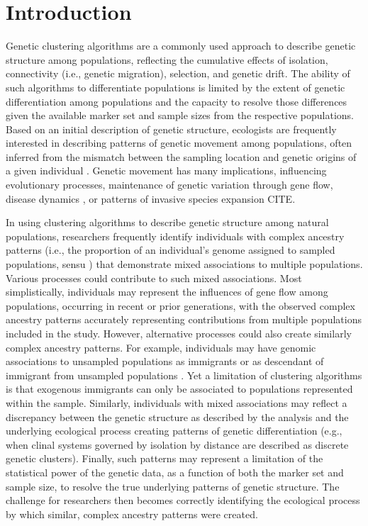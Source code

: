 
\section*{Introduction}

Genetic clustering algorithms are a commonly used approach to describe genetic structure among populations, reflecting the cumulative effects of isolation, connectivity (i.e., genetic migration), selection, and genetic drift.  The ability of such algorithms to differentiate populations is limited by the extent of genetic differentiation among populations and the capacity to resolve those differences given the available marker set and sample sizes from the respective populations.  Based on an initial description of genetic structure, ecologists are frequently interested in describing patterns of genetic movement among populations, often inferred from the mismatch between the sampling location and genetic origins of a given individual \citep{paetkau1995microsatellite,wilson2003bayesian}.  Genetic movement has many implications, influencing evolutionary processes, maintenance of genetic variation through gene flow, disease dynamics \citep{huestis2019windborne}, or patterns of invasive species expansion CITE.

	In using clustering algorithms to describe genetic structure among natural populations, researchers frequently identify individuals with complex ancestry patterns (i.e., the proportion of an individual’s genome assigned to sampled populations, sensu \citealt{pritchard2000inference}) that demonstrate mixed associations to multiple populations.  Various processes could contribute to such mixed associations.  Most simplistically, individuals may represent the influences of gene flow among populations, occurring in recent or prior generations, with the observed complex ancestry patterns accurately representing contributions from multiple populations included in the study.  However, alternative processes could also create similarly complex ancestry patterns.  For example, individuals may have genomic associations to unsampled populations as immigrants or as descendant of immigrant from unsampled populations \citep{pritchard2000inference,beerli2004effect}.  Yet a limitation of clustering algorithms is that exogenous immigrants can only be associated to populations represented within the sample.  Similarly, individuals with mixed associations may reflect a discrepancy between the genetic structure as described by the analysis and the underlying ecological process creating patterns of genetic differentiation (e.g., when clinal systems governed by isolation by distance are described as discrete genetic clusters).  Finally, such patterns may represent a limitation of the statistical power of the genetic data, as a function of both the marker set and sample size, to resolve the true underlying patterns of genetic structure.  The challenge for researchers then becomes correctly identifying the ecological process by which similar, complex ancestry patterns were created.

